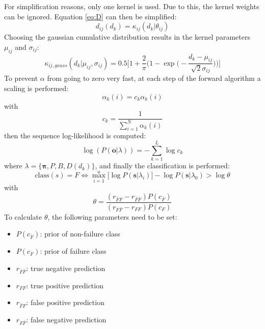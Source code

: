 \documentclass[mscthesis]{usiinfthesis}
\begin{document}
For simplification reasons, only one kernel is used. Due to this, the kernel
weights can be ignored. Equation \ref{eq:D} can then be simplified:
\begin{equation}
    \label{eq:D_fact}
    d_{ij}(d_k) = \kappa_{ij}(d_k | \theta_{ij})
\end{equation}
Choosing the gaussian cumulative distribution results in the kernel parameters
$ \mu_{ij} $ and $ \sigma_{ij} $:
\begin{equation}
    \label{eq:kernel}
    \kappa_{ij, gauss}(d_k | \mu_{ij}, \sigma_{ij}) = 
        0.5\bigg [1 + \frac{2}{\pi}\Big (
            1 - \exp \big (-\frac{d_k - \mu_{ij}}{\sqrt 2 \sigma_{ij}}\big )
        \Big ) \bigg ]
\end{equation}
To prevent $ \alpha $ from going to zero very fast, at each step of the forward
algorithm a scaling is performed:
\begin{equation}
    \alpha_k(i) = c_k \alpha_k(i)
\end{equation}
with
\begin{equation}
    c_k = \frac{1}{\sum\limits_{i=1}^{N} \alpha_k(i)}
\end{equation}
then the sequence log-likelihood is computed:
\begin{equation}
    \log(P(\boldsymbol{o}|\lambda)) = -\sum\limits_{k=1}^{L} \log c_k
\end{equation}
where $ \lambda = \{\boldsymbol{\pi}, P, B, D(d_k) \} $,  and finally the
classification is performed:
\begin{equation}
    \label{eq:class}
    \text{class}(s) = F \iff \max_{i=1}^{u} \big [
        \log P(\boldsymbol{s}|\lambda_i)
    \big ] - \log P(\boldsymbol{s}|\lambda_0) > \log \theta
\end{equation}
with
\begin{equation}
    \label{eq:class_thresh}
    \theta = \frac{(r_{\bar{F}F} - r_{\bar{F}\bar{F}})P(c_{\bar{F}})}
        {(r_{F \bar{F}} - r_{FF})P(c_{F})}
\end{equation}
To calculate $ \theta $, the following parameters need to be set:
\begin{itemize}
    \item $ P(c_{\bar{F}}) $: prior of non-failure class
    \item $ P(c_F) $: prior of failure class
    \item $ r_{\bar{F}\bar{F}} $: true negative prediction
    \item $ r_{FF} $: true positive prediction
    \item $ r_{\bar{F}F} $: false positive prediction
    \item $ r_{F\bar{F}} $: false negative prediction
\end{itemize}
\end{document}
